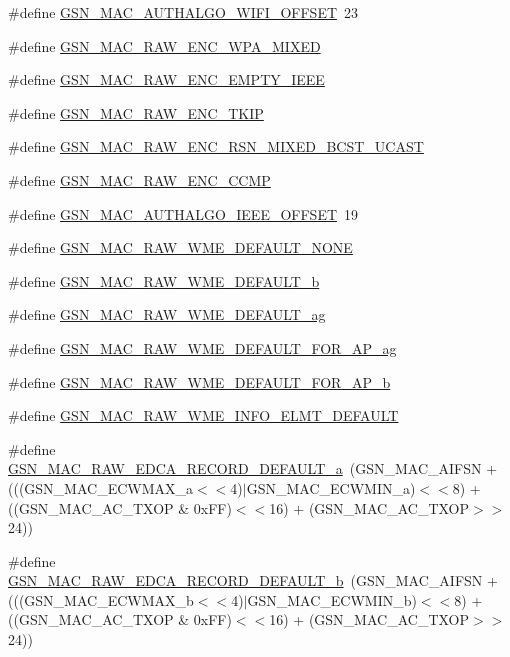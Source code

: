 \begin{DoxyCompactItemize}
\#define \hyperlink{a00522_a63f3e42dcf8f37691b201e5c28ff1af4}{GSN\_\-MAC\_\-AUTHALGO\_\-WIFI\_\-OFFSET}~23
\item 
\#define \hyperlink{a00522_a319b13288dfda86c84aca64c53e237be}{GSN\_\-MAC\_\-RAW\_\-ENC\_\-WPA\_\-MIXED}
\item 
\#define \hyperlink{a00522_a0184f7bca23d8fbf8e1e34218dfdc5cd}{GSN\_\-MAC\_\-RAW\_\-ENC\_\-EMPTY\_\-IEEE}
\item 
\#define \hyperlink{a00522_a1ced7ca9aa96a24131a432f100805486}{GSN\_\-MAC\_\-RAW\_\-ENC\_\-TKIP}
\item 
\#define \hyperlink{a00522_a2db75e20595a14ebbfc87cf7a4412275}{GSN\_\-MAC\_\-RAW\_\-ENC\_\-RSN\_\-MIXED\_\-BCST\_\-UCAST}
\item 
\#define \hyperlink{a00522_af9645e02bccd38d54ca4457c95602515}{GSN\_\-MAC\_\-RAW\_\-ENC\_\-CCMP}
\item 
\#define \hyperlink{a00522_a3f834791f07b7653474176ab939e21c0}{GSN\_\-MAC\_\-AUTHALGO\_\-IEEE\_\-OFFSET}~19
\item 
\#define \hyperlink{a00522_af40eb635eee7c90b7fcf4026698fe997}{GSN\_\-MAC\_\-RAW\_\-WME\_\-DEFAULT\_\-NONE}
\item 
\#define \hyperlink{a00522_aaf41ff6e32cc859056ba8f9b0b2e0d0c}{GSN\_\-MAC\_\-RAW\_\-WME\_\-DEFAULT\_\-b}
\item 
\#define \hyperlink{a00522_a8c69b41f7a9e50fb5a43723a42f5d907}{GSN\_\-MAC\_\-RAW\_\-WME\_\-DEFAULT\_\-ag}
\item 
\#define \hyperlink{a00522_a5f1ccdaae26e9bdbd5562b7758a4e6c3}{GSN\_\-MAC\_\-RAW\_\-WME\_\-DEFAULT\_\-FOR\_\-AP\_\-ag}
\item 
\#define \hyperlink{a00522_a609c9b0c285c0cc97d94592176b9efb2}{GSN\_\-MAC\_\-RAW\_\-WME\_\-DEFAULT\_\-FOR\_\-AP\_\-b}
\item 
\#define \hyperlink{a00522_aa39e92a660fb9f64e3407182f200e491}{GSN\_\-MAC\_\-RAW\_\-WME\_\-INFO\_\-ELMT\_\-DEFAULT}
\item 
\#define \hyperlink{a00522_a498a49091ec42fa97c69fb7df3016f40}{GSN\_\-MAC\_\-RAW\_\-EDCA\_\-RECORD\_\-DEFAULT\_\-a}~(GSN\_\-MAC\_\-AIFSN + (((GSN\_\-MAC\_\-ECWMAX\_\-a$<$$<$4)$|$GSN\_\-MAC\_\-ECWMIN\_\-a)$<$$<$8) + ((GSN\_\-MAC\_\-AC\_\-TXOP \& 0xFF)$<$$<$16) + (GSN\_\-MAC\_\-AC\_\-TXOP$>$$>$24))
\item 
\#define \hyperlink{a00522_ac71a60526676789c6e1b77ed47eb4a45}{GSN\_\-MAC\_\-RAW\_\-EDCA\_\-RECORD\_\-DEFAULT\_\-b}~(GSN\_\-MAC\_\-AIFSN + (((GSN\_\-MAC\_\-ECWMAX\_\-b$<$$<$4)$|$GSN\_\-MAC\_\-ECWMIN\_\-b)$<$$<$8) + ((GSN\_\-MAC\_\-AC\_\-TXOP \& 0xFF)$<$$<$16) + (GSN\_\-MAC\_\-AC\_\-TXOP$>$$>$24))

\end{DoxyCompactItemize}
